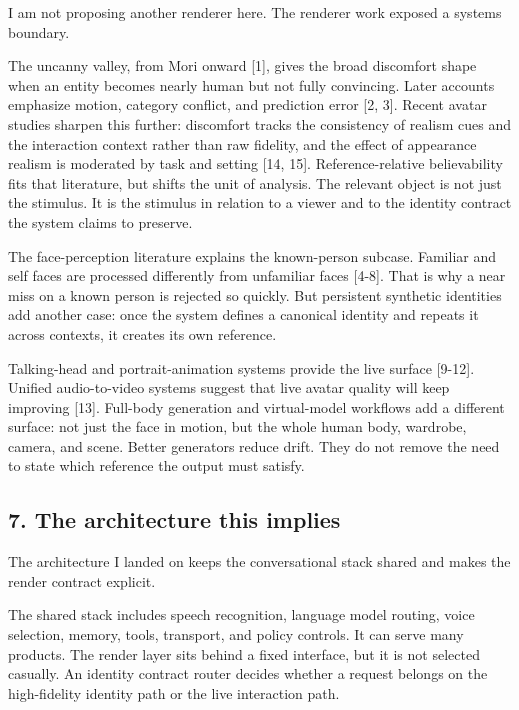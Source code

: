\documentclass[
]{article}
\begin{document}
I am not proposing another renderer here. The renderer work exposed a
systems boundary.

The uncanny valley, from Mori onward {[}1{]}, gives the broad discomfort
shape when an entity becomes nearly human but not fully convincing.
Later accounts emphasize motion, category conflict, and prediction error
{[}2, 3{]}. Recent avatar studies sharpen this further: discomfort
tracks the consistency of realism cues and the interaction context
rather than raw fidelity, and the effect of appearance realism is
moderated by task and setting {[}14, 15{]}. Reference-relative
believability fits that literature, but shifts the unit of analysis. The
relevant object is not just the stimulus. It is the stimulus in relation
to a viewer and to the identity contract the system claims to preserve.

The face-perception literature explains the known-person subcase.
Familiar and self faces are processed differently from unfamiliar faces
{[}4-8{]}. That is why a near miss on a known person is rejected so
quickly. But persistent synthetic identities add another case: once the
system defines a canonical identity and repeats it across contexts, it
creates its own reference.

Talking-head and portrait-animation systems provide the live surface
{[}9-12{]}. Unified audio-to-video systems suggest that live avatar
quality will keep improving {[}13{]}. Full-body generation and
virtual-model workflows add a different surface: not just the face in
motion, but the whole human body, wardrobe, camera, and scene. Better
generators reduce drift. They do not remove the need to state which
reference the output must satisfy.

\subsection{7. The architecture this
implies}\label{7-the-architecture-this-implies}

The architecture I landed on keeps the conversational stack shared and
makes the render contract explicit.

The shared stack includes speech recognition, language model routing,
voice selection, memory, tools, transport, and policy controls. It can
serve many products. The render layer sits behind a fixed interface, but
it is not selected casually. An identity contract router decides whether
a request belongs on the high-fidelity identity path or the live
interaction path.
\end{document}
